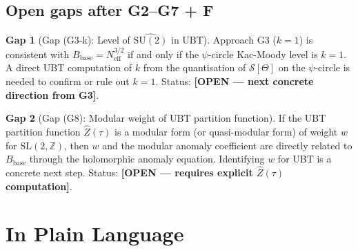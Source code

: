 \documentclass[11pt,a4paper]{article}
\theoremstyle{definition}
\newtheorem{gap}{Gap}
\theoremstyle{remark}
\begin{document}
\subsection{Open gaps after G2--G7 + F}

\begin{gap}[Gap (G3-k): Level of $\widehat{\mathrm{SU}(2)}$ in UBT]
  \label{gap:G3_k}
  Approach G3 ($k = 1$) is consistent with $B_{\mathrm{base}} =
  N_{\mathrm{eff}}^{3/2}$ if and only if the $\psi$-circle Kac-Moody
  level is $k = 1$.
  A direct UBT computation of $k$ from the quantisation of
  $\mathcal{S}[\Theta]$ on the $\psi$-circle is needed to confirm or
  rule out $k = 1$.
  Status: \textbf{[OPEN — next concrete direction from G3]}.
\end{gap}

\begin{gap}[Gap (G8): Modular weight of UBT partition function]
  \label{gap:G8}
  If the UBT partition function $\hat{Z}(\tau)$ is a modular form (or
  quasi-modular form) of weight $w$ for $\mathrm{SL}(2,\mathbb{Z})$, then
  $w$ and the modular anomaly coefficient are directly related to
  $B_{\mathrm{base}}$ through the holomorphic anomaly equation.
  Identifying $w$ for UBT is a concrete next step.
  Status: \textbf{[OPEN — requires explicit $\hat{Z}(\tau)$ computation]}.
\end{gap}

\section{In Plain Language}
\label{sec:plain}
\end{document}
